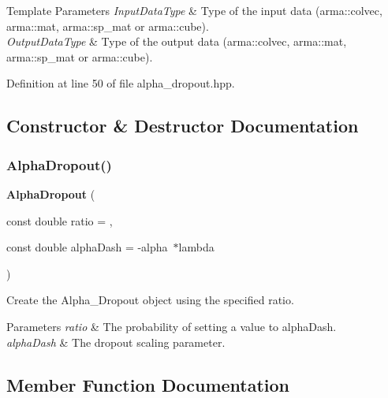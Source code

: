 \begin{DoxyTemplParams}{Template Parameters}
{\em Input\+Data\+Type} & Type of the input data (arma\+::colvec, arma\+::mat, arma\+::sp\+\_\+mat or arma\+::cube). \\
\hline
{\em Output\+Data\+Type} & Type of the output data (arma\+::colvec, arma\+::mat, arma\+::sp\+\_\+mat or arma\+::cube). \\
\hline
\end{DoxyTemplParams}


Definition at line 50 of file alpha\+\_\+dropout.\+hpp.



\subsection{Constructor \& Destructor Documentation}
\mbox{\label{classmlpack_1_1ann_1_1AlphaDropout_ad6541c5c189746d32b9067d26b9409c5}} 
\subsubsection{Alpha\+Dropout()}
{\footnotesize\ttfamily \textbf{ Alpha\+Dropout} (\begin{DoxyParamCaption}\item[{const double}]{ratio = {},  }\item[{const double}]{alpha\+Dash = {\ttfamily -\/alpha~$\ast$lambda} }\end{DoxyParamCaption})}



Create the Alpha\+\_\+\+Dropout object using the specified ratio. 


\begin{DoxyParams}{Parameters}
{\em ratio} & The probability of setting a value to alpha\+Dash. \\
\hline
{\em alpha\+Dash} & The dropout scaling parameter. \\
\hline
\end{DoxyParams}


\subsection{Member Function Documentation}
\mbox{\label{classmlpack_1_1ann_1_1AlphaDropout_aab6c632054fc383ec1edf83231163bf7}} 
